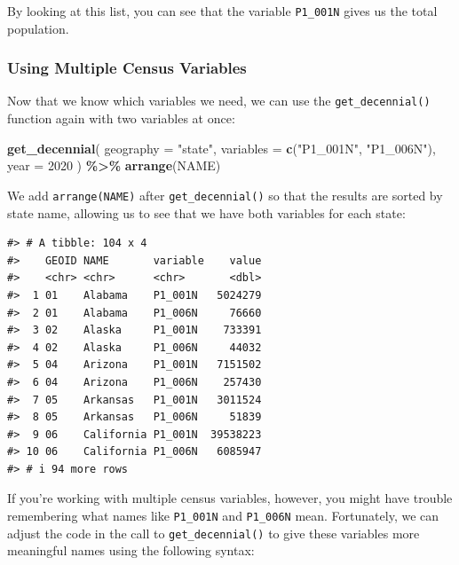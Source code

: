 \documentclass[
]{book}
\newenvironment{Shaded}{\begin{snugshade}}{\end{snugshade}}
\newcommand{\AttributeTok}[1]{\textcolor[rgb]{0.13,0.29,0.53}{#1}}
\newcommand{\DecValTok}[1]{\textcolor[rgb]{0.00,0.00,0.81}{#1}}
\newcommand{\FunctionTok}[1]{\textcolor[rgb]{0.13,0.29,0.53}{\textbf{#1}}}
\newcommand{\NormalTok}[1]{#1}
\newcommand{\SpecialCharTok}[1]{\textcolor[rgb]{0.81,0.36,0.00}{\textbf{#1}}}
\newcommand{\StringTok}[1]{\textcolor[rgb]{0.31,0.60,0.02}{#1}}
\begin{document}
By looking at this list, you can see that the variable \texttt{P1\_001N} gives us the total population.

\hypertarget{using-multiple-census-variables}{%
\subsubsection*{Using Multiple Census Variables}\label{using-multiple-census-variables}}

Now that we know which variables we need, we can use the \texttt{get\_decennial()} function again with two variables at once:

\begin{Shaded}
\begin{Highlighting}[]
\FunctionTok{get\_decennial}\NormalTok{(}
  \AttributeTok{geography =} \StringTok{"state"}\NormalTok{,}
  \AttributeTok{variables =} \FunctionTok{c}\NormalTok{(}\StringTok{"P1\_001N"}\NormalTok{, }\StringTok{"P1\_006N"}\NormalTok{),}
  \AttributeTok{year =} \DecValTok{2020}
\NormalTok{) }\SpecialCharTok{\%\textgreater{}\%}
  \FunctionTok{arrange}\NormalTok{(NAME)}
\end{Highlighting}
\end{Shaded}

We add \texttt{arrange(NAME)} after \texttt{get\_decennial()} so that the results are sorted by state name, allowing us to see that we have both variables for each state:

\begin{verbatim}
#> # A tibble: 104 x 4
#>    GEOID NAME       variable    value
#>    <chr> <chr>      <chr>       <dbl>
#>  1 01    Alabama    P1_001N   5024279
#>  2 01    Alabama    P1_006N     76660
#>  3 02    Alaska     P1_001N    733391
#>  4 02    Alaska     P1_006N     44032
#>  5 04    Arizona    P1_001N   7151502
#>  6 04    Arizona    P1_006N    257430
#>  7 05    Arkansas   P1_001N   3011524
#>  8 05    Arkansas   P1_006N     51839
#>  9 06    California P1_001N  39538223
#> 10 06    California P1_006N   6085947
#> # i 94 more rows
\end{verbatim}

If you're working with multiple census variables, however, you might have trouble remembering what names like \texttt{P1\_001N} and \texttt{P1\_006N} mean. Fortunately, we can adjust the code in the call to \texttt{get\_decennial()} to give these variables more meaningful names using the following syntax:
\end{document}

